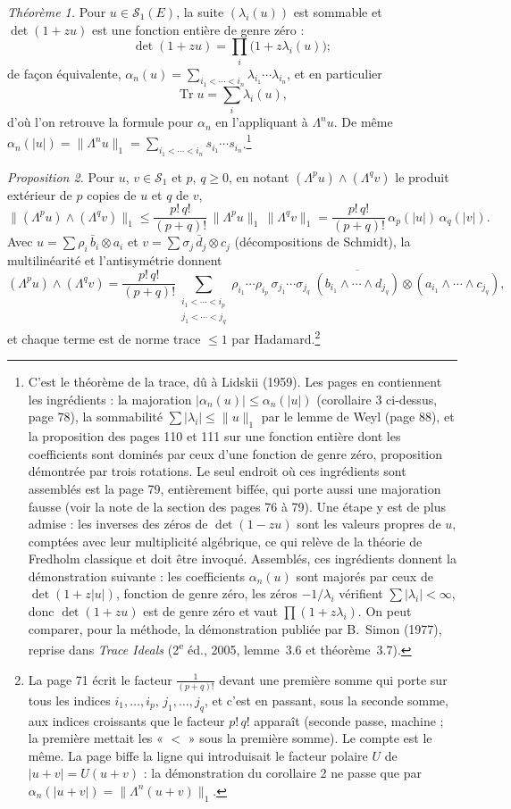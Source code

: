 \documentclass[11pt,a4paper]{article}
\begin{document}
\emph{Théorème 1.} Pour $u \in \mathcal{S}_1(E)$, la suite $(\lambda_i(u))$ est
sommable et $\det(1+zu)$ est une fonction entière de genre zéro :
\[
  \det(1+zu) = \prod_i \bigl(1 + z\lambda_i(u)\bigr) ;
\]
de façon équivalente, $\alpha_n(u) = \sum_{i_1 < \cdots < i_n} \lambda_{i_1}
\cdots \lambda_{i_n}$, et en particulier
\[
  \operatorname{Tr} u = \sum_i \lambda_i(u),
\]
d'où l'on retrouve la formule pour $\alpha_n$ en l'appliquant à
$\Lambda^n u$. De même $\alpha_n(|u|) = \|\Lambda^n u\|_1 = \sum_{i_1 <
\cdots < i_n} s_{i_1} \cdots s_{i_n}$.\footnote{C'est le théorème de la
trace, dû à Lidskii (1959). Les pages en contiennent les ingrédients : la
majoration $|\alpha_n(u)| \leq \alpha_n(|u|)$ (corollaire 3 ci-dessus,
page 78), la sommabilité $\sum |\lambda_i| \leq \|u\|_1$ par le lemme de Weyl
(page 88), et la proposition des pages 110 et 111 sur une fonction entière
dont les coefficients sont dominés par ceux d'une fonction de genre zéro,
proposition démontrée par trois rotations. Le seul endroit où ces
ingrédients sont assemblés est la page 79, entièrement biffée, qui porte
aussi une majoration fausse (voir la note de la section des pages 76 à 79).
Une étape y est de plus admise : les inverses des zéros de $\det(1 - zu)$
sont les valeurs propres de $u$, comptées avec leur multiplicité algébrique,
ce qui relève de la théorie de Fredholm classique et doit être invoqué.
Assemblés, ces ingrédients donnent la démonstration suivante : les
coefficients $\alpha_n(u)$ sont majorés par ceux de $\det(1+z|u|)$, fonction
de genre zéro, les zéros $-1/\lambda_i$ vérifient $\sum |\lambda_i| < \infty$,
donc $\det(1+zu)$ est de genre zéro et vaut $\prod(1+z\lambda_i)$. On peut
comparer, pour la méthode, la démonstration publiée par B.~Simon (1977),
reprise dans \emph{Trace Ideals} (2\textsuperscript{e} éd., 2005, lemme~3.6
et théorème~3.7).}

\emph{Proposition 2.} Pour $u$, $v \in \mathcal{S}_1$ et $p$, $q \geq 0$, en
notant $(\Lambda^p u) \wedge (\Lambda^q v)$ le produit extérieur de $p$
copies de $u$ et $q$ de $v$,
\[
  \|(\Lambda^p u) \wedge (\Lambda^q v)\|_1 \leq \frac{p!\,q!}{(p+q)!}\,
  \|\Lambda^p u\|_1\,\|\Lambda^q v\|_1
  = \frac{p!\,q!}{(p+q)!}\,\alpha_p(|u|)\,\alpha_q(|v|) .
\]
Avec $u = \sum \rho_i\,\bar{b}_i \otimes a_i$ et $v = \sum \sigma_j\,\bar{d}_j
\otimes c_j$ (décompositions de Schmidt), la multilinéarité et
l'antisymétrie donnent
\[
  (\Lambda^p u) \wedge (\Lambda^q v) = \frac{p!\,q!}{(p+q)!}
  \sum_{\substack{i_1 < \cdots < i_p\\ j_1 < \cdots < j_q}}
  \rho_{i_1} \cdots \rho_{i_p}\,\sigma_{j_1} \cdots \sigma_{j_q}\;
  \overline{(b_{i_1} \wedge \cdots \wedge d_{j_q})} \otimes
  (a_{i_1} \wedge \cdots \wedge c_{j_q}),
\]
et chaque terme est de norme trace $\leq 1$ par Hadamard.\footnote{La page
71 écrit le facteur $\frac{1}{(p+q)!}$ devant une première somme qui porte
sur tous les indices $i_1, \ldots, i_p$, $j_1, \ldots, j_q$, et c'est en
passant, sous la seconde somme, aux indices croissants que le facteur
$p!\,q!$ apparaît (seconde passe, machine ; la première mettait les « $<$ »
sous la première somme). Le compte est le même. La page biffe la ligne qui
introduisait le facteur polaire $U$ de $|u+v| = U(u+v)$ : la démonstration
du corollaire 2 ne passe que par $\alpha_n(|u+v|) = \|\Lambda^n(u+v)\|_1$.}
\end{document}
